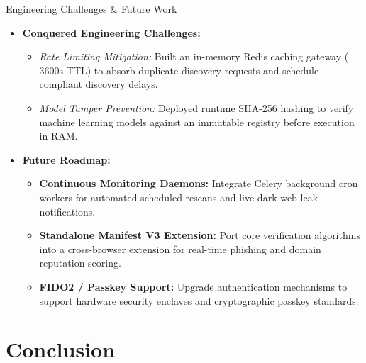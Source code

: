 \documentclass[aspectratio=169,10pt]{beamer}
\begin{document}
\begin{frame}{Engineering Challenges \& Future Work}
  \small
  \begin{itemize}\setlength{\itemsep}{0.28cm}
    \item \textbf{Conquered Engineering Challenges:}
      \begin{itemize}\setlength{\itemsep}{0.10cm}
        \item \scriptsize \textit{Rate Limiting Mitigation:} Built an in-memory Redis caching gateway ($3600\text{s}$ TTL) to absorb duplicate discovery requests and schedule compliant discovery delays.
        \item \scriptsize \textit{Model Tamper Prevention:} Deployed runtime SHA-256 hashing to verify machine learning models against an immutable registry before execution in RAM.
      \end{itemize}
    \item \textbf{Future Roadmap:}
      \begin{itemize}\setlength{\itemsep}{0.10cm}
        \item \scriptsize \textbf{Continuous Monitoring Daemons:} Integrate Celery background cron workers for automated scheduled rescans and live dark-web leak notifications.
        \item \scriptsize \textbf{Standalone Manifest V3 Extension:} Port core verification algorithms into a cross-browser extension for real-time phishing and domain reputation scoring.
        \item \textbf{FIDO2 / Passkey Support:} Upgrade authentication mechanisms to support hardware security enclaves and cryptographic passkey standards.
      \end{itemize}
  \end{itemize}
\end{frame}

\section{Conclusion}
\end{document}
